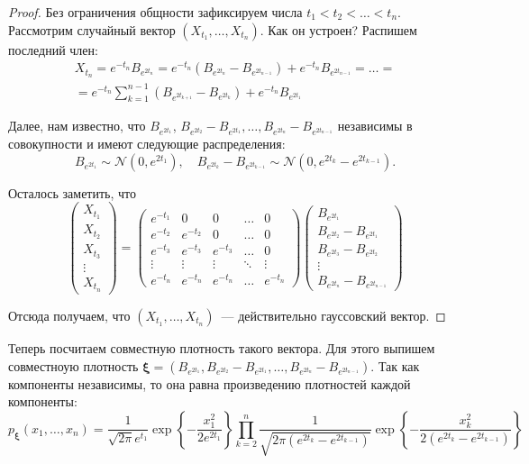\begin{proof}
	Без ограничения общности зафиксируем числа \(t_{1} < t_{2} < \ldots < 
	t_{n}\). Рассмотрим случайный вектор \((X_{t_{1}}, \ldots, X_{t_{n}})\). 
	Как он устроен? Распишем последний член:
	\begin{multline*}
		X_{t_{n}} = e^{-t_{n}}B_{e^{2t_{n}}} = e^{-t_{n}}(B_{e^{2t_{n}}} - 
		B_{e^{2t_{n - 1}}}) + e^{-t_{n}}B_{e^{2t_{n - 1}}} = \ldots = \\ = 
		e^{-t_{n}}\sum_{k = 1}^{n - 1} (B_{e^{2t_{k + 1}}} - 
		B_{e^{2t_{k}}}) + e^{-t_{n}}B_{e^{2t_{1}}}
	\end{multline*}
	
	Далее, нам известно, что \(B_{e^{2t_{1}}}\), \(B_{e^{2t_{2}}} - 
	B_{e^{2t_{1}}}, \ldots, B_{e^{2t_{n}}} - B_{e^{2t_{n - 1}}}\) независимы в 
	совокупности и имеют следующие распределения:
	\[
		B_{e^{2t_{1}}} \sim \mathcal{N}(0, e^{2t_{1}}), \quad B_{e^{2t_{k}}} - 
		B_{e^{2t_{k - 1}}} \sim \mathcal{N}(0, e^{2t_{k}} - e^{2t_{k - 1}}).
	\]
	
	Осталось заметить, что
	\[
	\begin{pmatrix}
	X_{t_{1}} \\ X_{t_{2}} \\ X_{t_{3}} \\ \vdots \\ X_{t_{n}}
	\end{pmatrix}
	=
	\begin{pmatrix}
	e^{-t_{1}} & 0 & 0 & \ldots & 0 \\
	e^{-t_{2}} & e^{-t_{2}} & 0 & \ldots & 0 \\
	e^{-t_{3}} & e^{-t_{3}} & e^{-t_{3}} & \ldots & 0 \\
	\vdots & \vdots & \vdots & \ddots & \vdots \\
	e^{-t_{n}} & e^{-t_{n}} & e^{-t_{n}} & \ldots & e^{-t_{n}}
	\end{pmatrix}
	\begin{pmatrix}
	B_{e^{2t_{1}}} \\ B_{e^{2t_{2}}} - B_{e^{2t_{1}}} \\ B_{e^{2t_{3}}} - 
	B_{e^{2t_{2}}} \\ \vdots \\ B_{e^{2t_{n}}} - B_{e^{2t_{n - 1}}}
	\end{pmatrix}
	\]
	
	Отсюда получаем, что \((X_{t_{1}}, \dots, X_{t_{n}})\)~--- действительно 
	гауссовский вектор.
\end{proof}
Теперь посчитаем совместную плотность такого вектора. Для этого выпишем 
совместноую плотность \(\bm{\xi} = (B_{e^{2t_{1}}}, B_{e^{2t_{2}}} - 
B_{e^{2t_{1}}}, \ldots, B_{e^{2t_{n}}} - B_{e^{2t_{n - 1}}})\). Так как 
компоненты независимы, то она равна произведению плотностей каждой компоненты:
\[
	p_{\bm{\xi}}(x_{1}, \dots, x_{n}) = \frac{1}{\sqrt{2\pi}e^{t_{1}}} 
	\exp\left\{-\frac{x_{1}^{2}}{2e^{2t_{1}}}\right\}\prod_{k = 2}^{n} 
	\frac{1}{\sqrt{2\pi(e^{2t_{k}} - e^{2t_{k - 1}})}} 
	\exp\left\{-\frac{x_{k}^{2}}{2(e^{2t_{k}} - e^{2t_{k - 1}})}\right\}
\]

